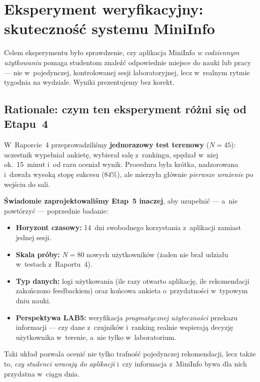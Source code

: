 \documentclass[14pt,a4paper]{extarticle}
\begin{document}
\section{Eksperyment weryfikacyjny: skuteczność systemu MiniInfo}

Celem eksperymentu było sprawdzenie, czy aplikacja MiniInfo \emph{w codziennym użytkowaniu} pomaga studentom znaleźć odpowiednie miejsce do nauki lub pracy --- nie w~pojedynczej, kontrolowanej sesji laboratoryjnej, lecz w~realnym rytmie tygodnia na wydziale. Wyniki prezentujemy bez korekt.

\subsection{Rationale: czym ten eksperyment różni się od Etapu~4}

W~Raporcie~4 przeprowadziliśmy \textbf{jednorazowy test terenowy} ($N = 45$): uczestnik wypełniał ankietę, wybierał salę z~rankingu, spędzał w~niej ok.~15~minut i~od razu oceniał wynik. Procedura była krótka, nadzorowana i~dawała wysoką stopę sukcesu ($84\%$), ale mierzyła głównie \emph{pierwsze wrażenie} po wejściu do sali.

\textbf{Świadomie zaprojektowaliśmy Etap~5 inaczej}, aby uzupełnić --- a~nie powtórzyć --- poprzednie badanie:
\begin{itemize}
    \item \textbf{Horyzont czasowy:} 14~dni swobodnego korzystania z~aplikacji zamiast jednej sesji.
    \item \textbf{Skala próby:} $N = 80$ nowych użytkowników (żaden nie brał udziału w~testach z~Raportu~4).
    \item \textbf{Typ danych:} logi użytkowania (ile razy otwarto aplikację, ile rekomendacji zakończono feedbackiem) oraz końcowa ankieta o~przydatności w~typowym dniu nauki.
    \item \textbf{Perspektywa LAB5:} weryfikacja \emph{pragmatycznej użyteczności} przekazu informacji --- czy dane z~czujników i~ranking realnie wspierają decyzję użytkownika w~terenie, a~nie tylko w~laboratorium.
\end{itemize}

Taki układ pozwala ocenić nie tylko trafność pojedynczej rekomendacji, lecz także to, \emph{czy studenci wracają do aplikacji} i~czy informacja z~MiniInfo bywa dla nich przydatna w~ciągu dnia.
\end{document}
